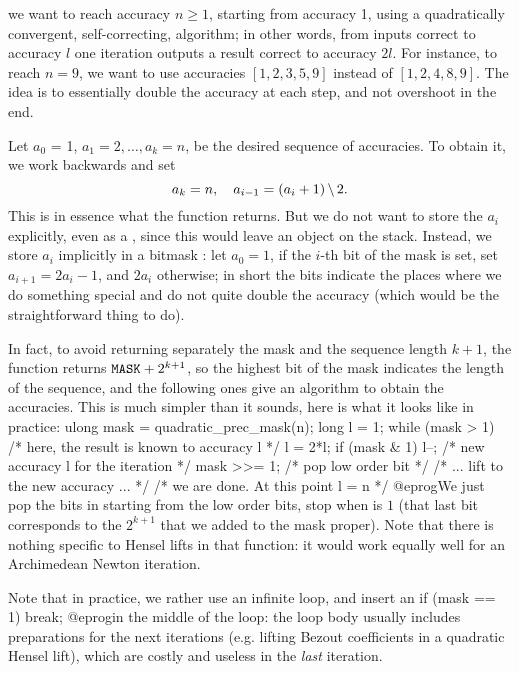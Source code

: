  we want to reach accuracy
$n\geq 1$, starting from accuracy 1, using a quadratically convergent,
self-correcting, algorithm; in other words, from inputs correct to accuracy
$l$ one iteration outputs a result correct to accuracy $2l$.
For instance, to reach $n = 9$, we want to use accuracies
$[1,2,3,5,9]$ instead of $[1,2,4,8,9]$. The idea is to essentially double
the accuracy at each step, and not overshoot in the end.

Let $a_0$ = 1, $a_1 = 2, \ldots, a_k = n$, be the desired sequence of
accuracies. To obtain it, we work backwards and set
$$ a_k = n,\quad a_{i-1} = (a_i + 1)\,\bs\, 2.$$
This is in essence what the function returns.
But we do not want to store the $a_i$ explicitly, even as a ,
since this would leave an object on the stack. Instead, we store $a_i$
implicitly in a bitmask : let $a_0 = 1$, if the $i$-th bit of the
mask is set, set $a_{i+1} = 2a_i - 1$, and $2a_i$ otherwise; in short the
bits indicate the places where we do something special and do not quite
double the accuracy (which would be the straightforward thing to do).

In fact, to avoid returning separately the mask and the sequence length
$k+1$, the function returns ${\tt MASK} + 2^{k+1}$, so the highest bit of
the mask indicates the length of the sequence, and the following ones give
an algorithm to obtain the accuracies. This is much simpler than it sounds,
here is what it looks like in practice:
\bprog
  ulong mask = quadratic_prec_mask(n);
  long l = 1;
  while (mask > 1) {            /* here, the result is known to accuracy l */
    l = 2*l; if (mask & 1) l--; /* new accuracy l for the iteration */
    mask >>= 1;                 /* pop low order bit */
    /* ... lift to the new accuracy ... */
  }
  /* we are done. At this point l = n */
@eprog\noindent We just pop the bits in  starting from the low
order bits, stop when  is $1$ (that last bit corresponds to the
$2^{k+1}$ that we added to the mask proper). Note that there is nothing
specific to Hensel lifts in that function: it would work equally well for
an Archimedean Newton iteration.

Note that in practice, we rather use an infinite loop, and insert an
\bprog
  if (mask == 1) break;
@eprog\noindent in the middle of the loop: the loop body usually includes
preparations for the next iterations (e.g. lifting Bezout coefficients
in a quadratic Hensel lift), which are costly and useless in the \emph{last}
iteration.

